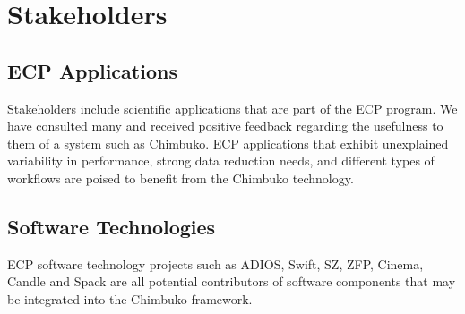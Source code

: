 \section{Stakeholders}

\subsection{ECP Applications}
Stakeholders include scientific applications that are part of the ECP program. We have consulted many and received positive feedback regarding the usefulness to them of a system such as Chimbuko. ECP applications that exhibit unexplained variability in performance, strong data reduction needs, and different types of workflows are poised to benefit from the Chimbuko technology.

\subsection{Software Technologies}					
 ECP software technology  projects such as ADIOS, Swift, SZ, ZFP, Cinema,  Candle and Spack are all potential contributors of software components that may be integrated into the Chimbuko framework.


